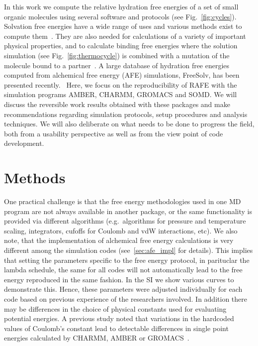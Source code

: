 \documentclass[journal=jctcce,manuscript=article]{achemso}
\begin{document}
In this work we compute the relative hydration free energies of a
set of small organic molecules using several software and protocols (see Fig.~\ref{fig:cycles}).  Solvation free
energies have a wide range of uses and various methods exist to compute
them~\cite{Skyner:2015:PCCP}.  They are also needed for calculations of a
variety of important physical properties, and to calculate binding free
energies where the solution simulation  (see Fig.~\ref{fig:thermocycle}) is
combined with a mutation of the molecule bound to a
partner~\cite{Skyner:2015:PCCP}.  A large database of hydration free energies
computed from alchemical free energy (AFE) simulations, FreeSolv, has been
presented recently.~\cite{Mobley2014,doi:10.1021/acs.jced.7b00104} Here, we focus on the
reproducibility of RAFE with the simulation programs AMBER, CHARMM, GROMACS and
SOMD.  We will discuss the reversible work results obtained with these packages
and make recommendations regarding simulation protocols, setup procedures and
analysis techniques.  We will also deliberate on what needs to be done to
progress the field, both from a usability perspective as well as from the view
point of code development.


\section{Methods}
\label{sec:methods}

One practical challenge is that the free energy methodologies used in
one MD program are not always available in another package, or the
same functionality is provided via different algorithms
(e.g.\ algorithms for pressure and temperature scaling, integrators,
cufoffs for Coulomb and vdW interactions, etc).  We also note, that
the implementation of alchemical free energy calculations is very
different among the simulation codes (see~\ref{sec:afe_impl} for
details).  This implies that setting the parameters specific to the
free energy protocol, in parituclar the lambda schedule, the same for
all codes will not automatically lead to the free energy reproduced in
the same fashion.  In the SI we show various curves to demonstrate this.
Hence, these parameters were adjusted individually for each code based
on previous experience of the researchers involved.  In addition there
may be differences in the choice of physical constants used for
evaluating potential energies.  A previous study noted that variations
in the hardcoded values of Coulomb's constant lead to detectable
differences in single point energies calculated by CHARMM, AMBER or
GROMACS~\cite{Shirts2017, SOMDcoulomb}.
\end{document}
